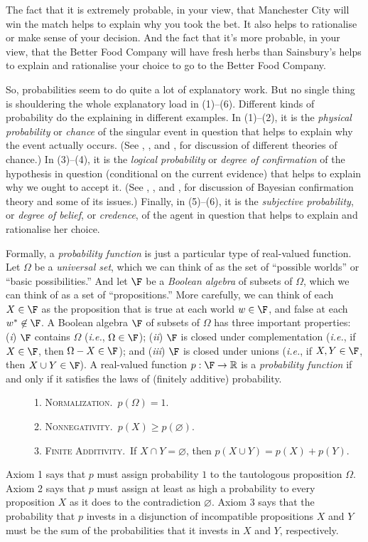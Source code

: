 The fact that it is extremely probable, in your view, that Manchester City will win the match helps to explain why you took the bet. It also helps to rationalise or make sense of your decision. And the fact that it's more probable, in your view, that the Better Food Company will have fresh herbs than Sainsbury's helps to explain and rationalise your choice to go to the Better Food Company.

So, probabilities seem to do quite a lot of explanatory work. But no single thing is shouldering the whole explanatory load in (1)--(6). Different kinds of probability do the explaining in different examples. In (1)--(2), it is the \emph{physical probability} or \emph{chance} of the singular event in question that helps to explain why the event actually occurs. (See \citealp{Hajek2009b}, \citealp{Gillies2000}, and \citealp{Hitchcock2012}, for discussion of different theories of chance.) In (3)--(4), it is the \emph{logical probability} or \emph{degree of confirmation} of the hypothesis in question (conditional on the current evidence) that helps to explain why we ought to accept it. (See \citealp{Earman1992}, \citealp{Hajek2008}, and \citealp{Paris2011}, for discussion of Bayesian confirmation theory and some of its issues.) Finally, in (5)--(6), it is the \emph{subjective probability}, or \emph{degree of belief}, or \emph{credence}, of the agent in question that helps to explain and rationalise her choice.

Formally, a \emph{probability function} is just a particular type of real-valued function. Let $\Omega$ be a \emph{universal set}, which we can think of as the set of ``possible worlds'' or ``basic possibilities.'' And let $\F$ be a \emph{Boolean algebra} of subsets of $\Omega$, which we can think of as a set of ``propositions.'' More carefully, we can think of each $X\in\F$ as the proposition that is true at each world $w\in\F$, and false at each $w^*\not\in\F$. A Boolean algebra $\F$ of subsets of $\Omega$ has three important properties: (\emph{i}) $\F$ contains $\Omega$ (\emph{i.e.}, $\Omega\in\F$); (\emph{ii}) $\F$ is closed under complementation (\emph{i.e.}, if $X\in\F$, then $\Omega-X\in\F$); and (\emph{iii}) $\F$ is closed under unions (\emph{i.e.}, if $X,Y\in\F$, then $X\cup Y\in\F$). A real-valued function $p:\F\rightarrow\mathbb{R}$ is a \emph{probability function} if and only if it satisfies the laws of (finitely additive) probability.
\begin{description}
\item[]1. \textsc{Normalization.}\, $p(\Omega)=1$.
\item[]2. \textsc{Nonnegativity.}\, $p(X)\geq p(\varnothing)$.
\item[]3. \textsc{Finite Additivity.}\, If $X\cap Y=\varnothing$, then $p(X\cup Y)=p(X)+p(Y)$.
\end{description}
Axiom 1 says that $p$ must assign probability $1$ to the tautologous proposition $\Omega$. Axiom 2 says that $p$ must assign at least as high a probability to every proposition $X$ as it does to the contradiction $\varnothing$. Axiom 3 says that the probability that $p$ invests in a disjunction of incompatible propositions $X$ and $Y$ must be the sum of the probabilities that it invests in $X$ and $Y$, respectively.

